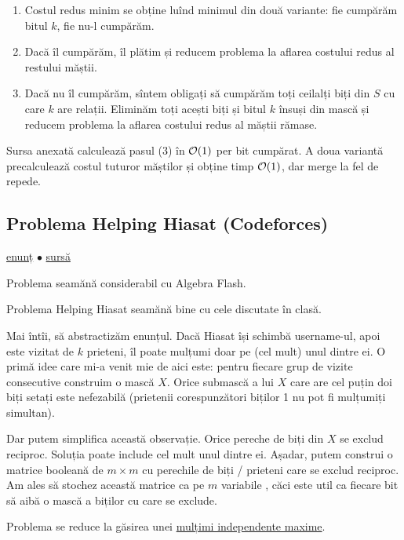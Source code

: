 \documentclass[../main.tex]{subfiles}
\begin{document}
\begin{enumerate}
  \item Costul redus minim se obține luînd minimul din două variante: fie cumpărăm bitul $k$, fie nu-l cumpărăm.

  \item Dacă îl cumpărăm, îl plătim și reducem problema la aflarea costului redus al restului măștii.

  \item Dacă nu îl cumpărăm, sîntem obligați să cumpărăm toți ceilalți biți din $S$ cu care $k$ are relații. Eliminăm toți acești biți și bitul $k$ însuși din mască și reducem problema la aflarea costului redus al măștii rămase.
\end{enumerate}

Sursa anexată calculează pasul (3) în $\mathcal{O}(1)$ per bit cumpărat. A doua variantă precalculează costul tuturor măștilor și obține timp $\mathcal{O}(1)$, dar merge la fel de repede.


\subsection{Problema Helping Hiasat (Codeforces)}
\label{problem:helping-hiasat}

\href{https://codeforces.com/contest/1105/problem/E}{enunț}
$\bullet$
\hyperref[code:helping-hiasat]{sursă}

Problema seamănă considerabil cu Algebra Flash.

Problema Helping Hiasat seamănă bine cu cele discutate în clasă.

Mai întîi, să abstractizăm enunțul. Dacă Hiasat își schimbă username-ul, apoi este vizitat de $k$ prieteni, îl poate mulțumi doar pe (cel mult) unul dintre ei. O primă idee care mi-a venit mie de aici este: pentru fiecare grup de vizite consecutive construim o mască $X$. Orice submască a lui $X$ care are cel puțin doi biți setați este nefezabilă (prietenii corespunzători biților 1 nu pot fi mulțumiți simultan).

Dar putem simplifica această observație. Orice pereche de biți din $X$ se exclud reciproc. Soluția poate include cel mult unul dintre ei. Așadar, putem construi o matrice booleană de $m \times m$ cu perechile de biți / prieteni care se exclud reciproc. Am ales să stochez această matrice ca pe $m$ variabile , căci este util ca fiecare bit să aibă o mască a biților cu care se exclude.

Problema se reduce la găsirea unei \href{https://en.wikipedia.org/wiki/Maximal_independent_set}{mulțimi independente maxime}.
\end{document}

